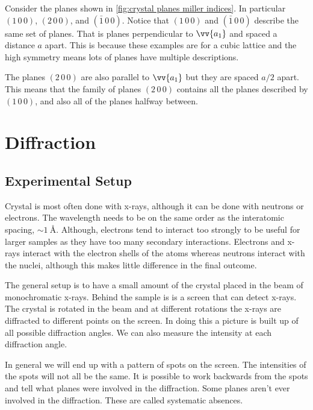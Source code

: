 \documentclass[fleqn]{NotesClass}
\newcommand*{\crystalplane}[3]{(#1\, #2\, #3)}
\begin{document}
    Consider the planes shown in \cref{fig:crystal planes miller indices}.
    In particular \(\crystalplane{1}{0}{0}\), \(\crystalplane{2}{0}{0}\), and \(\crystalplane{\bar{1}}{0}{0}\).
    Notice that \(\crystalplane{1}{0}{0}\) and \(\crystalplane{\bar{1}}{0}{0}\) describe the same set of planes.
    That is planes perpendicular to \(\vv{a_1}\) and spaced a distance \(a\) apart.
    This is because these examples are for a cubic lattice and the high symmetry means lots of planes have multiple descriptions.
    
    The planes \(\crystalplane{2}{0}{0}\) are also parallel to \(\vv{a_1}\) but they are spaced \(a/2\) apart.
    This means that the family of planes \(\crystalplane{2}{0}{0}\) contains all the planes described by \(\crystalplane{1}{0}{0}\), and also all of the planes halfway between.
    
    \chapter{Diffraction}
    \section{Experimental Setup}
    Crystal  is most often done with x-rays, although it can be done with neutrons or electrons.
    The wavelength needs to be on the same order as the interatomic spacing, \(\sim \qty{1}{\angstrom}\).
    Although, electrons tend to interact too strongly to be useful for larger samples as they have too many secondary interactions.
    Electrons and x-rays interact with the electron shells of the atoms whereas neutrons interact with the nuclei, although this makes little difference in the final outcome.
    
    The general setup is to have a small amount of the crystal placed in the beam of monochromatic x-rays.
    Behind the sample is is a screen that can detect x-rays.
    The crystal is rotated in the beam and at different rotations the x-rays are diffracted to different points on the screen.
    In doing this a picture is built up of all possible diffraction angles.
    We can also measure the intensity at each diffraction angle.
    
    In general we will end up with a pattern of spots on the screen.
    The intensities of the spots will not all be the same.
    It is possible to work backwards from the spots and tell what planes were involved in the diffraction.
    Some planes aren't ever involved in the diffraction.
    These are called systematic absences.
    
\end{document}
